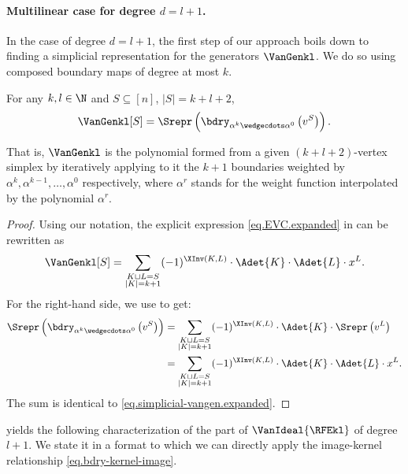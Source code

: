 \paragraph{Multilinear case for degree $d=l+1$.}
In the case of degree $d=l+1$, the first step of our approach boils down to finding a simplicial representation for the generators $\VanGenkl$. We do so using composed boundary maps of degree at most $k$.
\begin{lemma}
  \label{lem.simplicial-vangen}
  For any \(k,l \in \N\) and \(S\subseteq [n]\), $|S|=k+l+2$,
  \begin{equation} \label{eq.simplicial-vangen}
    \VanGenkl[S]
    =
    \Srepr \left( 
      \bdry_{\alpha^k\wedgecdots\alpha^0}\left(
        v^S
      \right)
     \right).
  \end{equation}
\end{lemma}
\noindent
That is, \(\VanGenkl\) is the polynomial formed from a given
\((k+l+2)\)-vertex simplex by iteratively applying to it the \(k+1\) boundaries weighted by \(\alpha^k, \alpha^{k-1}, \ldots, \alpha^0\) respectively, where \(\alpha^r\) stands for the weight function interpolated by the polynomial \(\alpha^r\).
\begin{proof}
Using our notation, the explicit expression \eqref{eq.EVC.expanded} in  can be rewritten as
  \begin{equation}
    \label{eq.simplicial-vangen.expanded}
      \VanGenkl[S] = \sum_{\substack{K\sqcup L= S \\ |K|=k+1}}
    (-1)^{\XInv(K,L)}\cdot \Adet{K}\cdot \Adet{L}\cdot x^L.
  \end{equation}
  For the right-hand side, we use  to get:
  \begin{align*}
      \Srepr \left(
      \bdry_{\alpha^k\wedgecdots\alpha^0}\left(
        v^S
      \right)
    \right) 
    &= 
    \sum_{\substack{K\sqcup L= S \\ |K|=k+1}} 
    (-1)^{\XInv(K,L)} \cdot
    \Adet{K}\cdot
    \Srepr \left( v^L \right) \\
    &= 
    \sum_{\substack{K\sqcup L= S \\ |K|=k+1}} 
    (-1)^{\XInv(K,L)} \cdot
    \Adet{K}\cdot
    \Adet{L}\cdot
    x^L.
  \end{align*}
  The sum is identical to \eqref{eq.simplicial-vangen.expanded}.
\end{proof}

 yields the following characterization of the part of $\VanIdeal{\RFEkl}$ of degree $l+1$. We state it in a format to which we can directly apply the image-kernel relationship \eqref{eq.bdry-kernel-image}.


